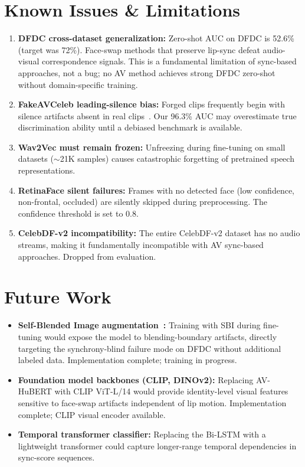 \documentclass[12pt, letterpaper]{article}
\begin{document}
\section{Known Issues \& Limitations}

\begin{enumerate}[leftmargin=1.5em, itemsep=4pt]
    \item \textbf{DFDC cross-dataset generalization:} Zero-shot AUC on DFDC is 52.6\% (target was 72\%). Face-swap methods that preserve lip-sync defeat audio-visual correspondence signals. This is a fundamental limitation of sync-based approaches, not a bug; no AV method achieves strong DFDC zero-shot without domain-specific training.
    \item \textbf{FakeAVCeleb leading-silence bias:} Forged clips frequently begin with silence artifacts absent in real clips~\cite{smeu2025}. Our 96.3\% AUC may overestimate true discrimination ability until a debiased benchmark is available.
    \item \textbf{Wav2Vec must remain frozen:} Unfreezing during fine-tuning on small datasets ($\sim$21K samples) causes catastrophic forgetting of pretrained speech representations.
    \item \textbf{RetinaFace silent failures:} Frames with no detected face (low confidence, non-frontal, occluded) are silently skipped during preprocessing. The confidence threshold is set to 0.8.
    \item \textbf{CelebDF-v2 incompatibility:} The entire CelebDF-v2 dataset has no audio streams, making it fundamentally incompatible with AV sync-based approaches. Dropped from evaluation.
\end{enumerate}

\section{Future Work}

\begin{itemize}[leftmargin=1.5em, itemsep=4pt]
    \item \textbf{Self-Blended Image augmentation~\cite{shiohara2022}:} Training with SBI during fine-tuning would expose the model to blending-boundary artifacts, directly targeting the synchrony-blind failure mode on DFDC without additional labeled data. Implementation complete; training in progress.
    \item \textbf{Foundation model backbones (CLIP, DINOv2):} Replacing AV-HuBERT with CLIP ViT-L/14 would provide identity-level visual features sensitive to face-swap artifacts independent of lip motion. Implementation complete; CLIP visual encoder available.
    \item \textbf{Temporal transformer classifier:} Replacing the Bi-LSTM with a lightweight transformer could capture longer-range temporal dependencies in sync-score sequences.
\end{itemize}
\end{document}
